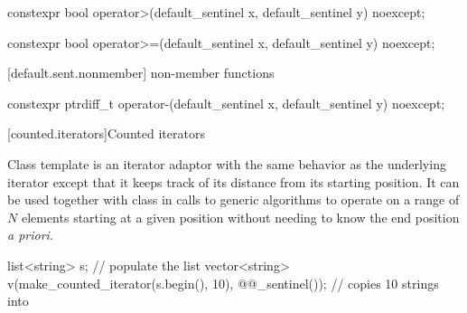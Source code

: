 \begin{addedblock}
{\begin{itemdescr}
\pnum
\returns {}
\end{itemdescr}

%
%
\begin{itemdecl}
constexpr bool operator>(default_sentinel x, default_sentinel y) noexcept;
\end{itemdecl}

\begin{itemdescr}
\pnum
\returns {}
\end{itemdescr}

%
%
\begin{itemdecl}
constexpr bool operator>=(default_sentinel x, default_sentinel y) noexcept;
\end{itemdecl}

\begin{itemdescr}
\pnum
\returns {}
\end{itemdescr}

[default.sent.nonmember]{ non-member functions}

%
%
\begin{itemdecl}
constexpr ptrdiff_t operator-(default_sentinel x, default_sentinel y) noexcept;
\end{itemdecl}

\begin{itemdescr}
\pnum
\returns {}
\end{itemdescr}
}

[counted.iterators]{Counted iterators}

\pnum
Class template  is an iterator adaptor
with the same behavior as the underlying iterator except that it
keeps track of its distance from its starting position. It can be
used together with class  in calls to generic
algorithms to operate on a range of $N$ elements starting at a given
position without needing to know the end position \textit{a priori}.

\pnum
\enterexample

\begin{codeblock}
list<string> s;
// populate the list 
vector<string> v(make_counted_iterator(s.begin(), 10),
                 @@_sentinel()); // copies 10 strings into 
\end{codeblock}


\end{addedblock}
